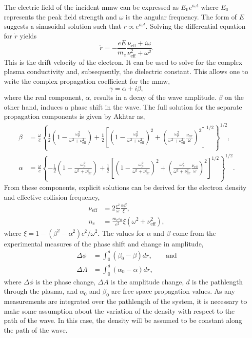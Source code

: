The electric field of the incident \acs{mmw} can be expressed as $E_0 e^{i\omega
t}$ where $E_0$ represents the peak field strength and $\omega$ is the angular
frequency. The form of $E$ suggests a sinusoidal solution such that $r \propto
e^{i\omega t}$. Solving the differential equation for $\dot{r}$ yields
  \begin{equation}
    \dot{r} = -\frac{eE}{m_e}\frac{\nu_\mathrm{eff} + i\omega}
                                  {\nu_\mathrm{eff}^2 + \omega^2}.
  \end{equation}
This is the drift velocity of the electron. It can be used to solve for the
complex plasma conductivity and, subsequently, the dielectric constant. This
allows one to write the complex propagation coefficient for the \acs{mmw},
  \begin{equation}
    \gamma = \alpha + i\beta,
  \end{equation}
where the real component, $\alpha$, results in a decay of the wave amplitude.
$\beta$ on the other hand, induces a phase shift in the wave. The full solution
for the separate propagation components is given by Akhtar \cite{Akhtar2003} as,
\newcommand{\ts}{\frac{\omega_p^2}{\omega^2 + \nu_\mathrm{eff}^2}}
\begin{align}
  \beta & = \frac{\omega}{c} \left\{ \frac{1}{2} \left(1 - \ts \right)
          + \frac{1}{2} \left[ \left( 1 - \ts \right)^2
          + \left( \ts \frac{\nu_\mathrm{eff}}{\omega} \right)^2
              \right]^{1/2} \right\}^{1/2}, \\
    \alpha & = \frac{\omega}{c} \left\{ -\frac{1}{2} \left(1 - \ts \right)
          + \frac{1}{2} \left[ \left( 1 - \ts \right)^2
          + \left( \ts \frac{\nu_\mathrm{eff}}{\omega} \right)^2
              \right]^{1/2} \right\}^{1/2}.
\end{align}
From these components, explicit solutions can be derived for the electron
density and effective collision frequency,
\begin{align}
  \nu_\mathrm{eff} & = 2 \frac{c^2}{\omega}\frac{\alpha\beta}{\xi}, \\
  n_e & = \frac{m_e\epsilon_0}{e^2}\xi
         \left(\omega^2+\nu_\mathrm{eff}^2\right), 
\end{align}
where $\xi = 1 - (\beta^2-\alpha^2)c^2/\omega^2$. The values for $\alpha$ and
$\beta$ come from the experimental measures of the phase shift and change in
amplitude,
    \begin{align}
        \Delta \phi &= \int_0^d \left( \beta_0 - \beta\right)dr, \qquad
        \textrm{and} \\
        \Delta A &= \int_0^d \left( \alpha_0 - \alpha \right)dr,
    \end{align}
where $\Delta \phi$ is the phase change, $\Delta A$ is the amplitude change, $d$
is the pathlength through the plasma, and $\alpha_0$ and $\beta_0$ are free
space propagation values. As any measurements are integrated over the pathlength
of the system, it is necessary to make some assumption about the variation of
the density with respect to the path of the wave. In this case, the density will
be assumed to be constant along the path of the wave.

